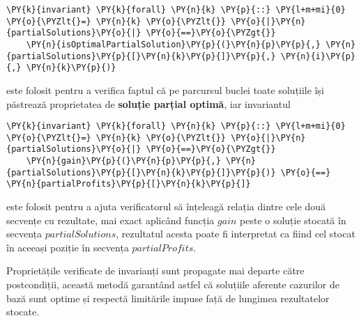\begin{sloppypar}
    \begin{Verbatim}[commandchars=\\\{\}]
\PY{k}{invariant} \PY{k}{forall} \PY{n}{k} \PY{p}{::} \PY{l+m+mi}{0} \PY{o}{\PYZlt{}=} \PY{n}{k} \PY{o}{\PYZlt{}} \PY{o}{|}\PY{n}{partialSolutions}\PY{o}{|} \PY{o}{==}\PY{o}{\PYZgt{}} 
    \PY{n}{isOptimalPartialSolution}\PY{p}{(}\PY{n}{p}\PY{p}{,} \PY{n}{partialSolutions}\PY{p}{[}\PY{n}{k}\PY{p}{]}\PY{p}{,} \PY{n}{i}\PY{p}{,} \PY{n}{k}\PY{p}{)}
\end{Verbatim}
    este folosit pentru a verifica faptul că pe parcursul buclei toate soluțiile își păstrează proprietatea de \textbf{soluție parțial optimă}, iar invariantul 
    \begin{Verbatim}[commandchars=\\\{\}]
\PY{k}{invariant} \PY{k}{forall} \PY{n}{k} \PY{p}{::} \PY{l+m+mi}{0} \PY{o}{\PYZlt{}=} \PY{n}{k} \PY{o}{\PYZlt{}} \PY{o}{|}\PY{n}{partialSolutions}\PY{o}{|} \PY{o}{==}\PY{o}{\PYZgt{}} 
    \PY{n}{gain}\PY{p}{(}\PY{n}{p}\PY{p}{,} \PY{n}{partialSolutions}\PY{p}{[}\PY{n}{k}\PY{p}{]}\PY{p}{)} \PY{o}{==} \PY{n}{partialProfits}\PY{p}{[}\PY{n}{k}\PY{p}{]}
\end{Verbatim}
    este folosit pentru a ajuta verificatorul să înțeleagă relația dintre cele două secvențe cu rezultate, mai exact aplicând funcția $gain$ peste o soluție stocată în secvența $partialSolutions$, rezultatul acesta poate fi interpretat ca fiind cel stocat în aceeași poziție în secvența $partialProfits$.
    \par Proprietățile verificate de invarianți sunt propagate mai departe către postcondiții, această metodă garantând astfel că soluțiile aferente cazurilor de bază sunt optime și respectă limitările impuse față de lungimea rezultatelor stocate.  \\ \par


\end{sloppypar}
